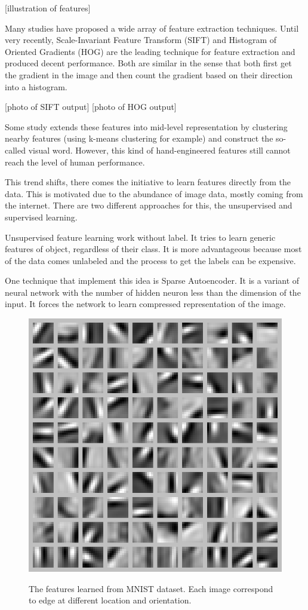 \documentclass[a4paper,11pt]{kth-mag}
\begin{document}
[illustration of features]

Many studies have proposed a wide array of feature extraction techniques. Until very recently, Scale-Invariant Feature Transform (SIFT) and Histogram of Oriented Gradients (HOG) are the leading technique for feature extraction and produced decent performance. Both are similar in the sense that both first get the gradient in the image and then count the gradient based on their direction into a histogram.

[photo of SIFT output]
[photo of HOG output]

Some study extends these features into mid-level representation by clustering nearby features (using k-means clustering for example) and construct the so-called visual word. However, this kind of hand-engineered features still cannot reach the level of human performance.

This trend shifts, there comes the initiative to learn features directly from the data. This is motivated due to the abundance of image data, mostly coming from the internet. There are two different approaches for this, the unsupervised and supervised learning.

Unsupervised feature learning work without label. It tries to learn generic features of object, regardless of their class. It is more advantageous because most of the data comes unlabeled and the process to get the labels can be expensive.

One technique that implement this idea is Sparse Autoencoder. It is a variant of neural network with the number of hidden neuron less than the dimension of the input. It forces the network to learn compressed representation of the image.

\begin{figure}[h]
\centering
\includegraphics[scale=0.3]{image/autoencoder.png}
\label{fig:autoencoder}
\caption{The features learned from MNIST dataset. Each image correspond to edge at different location and orientation.}
\end{figure}
\end{document}
